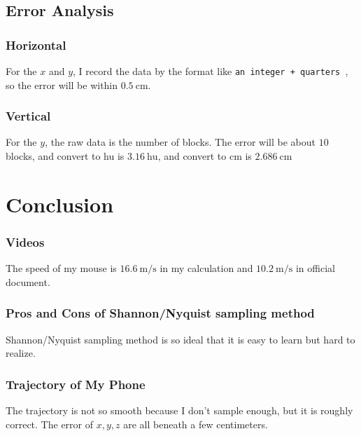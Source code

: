 \documentclass{article}
\begin{document}
\subsection{Error Analysis}
\subsubsection{Horizontal}
For the $x$ and $y$, I record the data by the format like \verb|an integer + quarters |, so the error will be within $0.5 ~ \mathrm{cm}$.
\subsubsection{Vertical}
For the $y$, the raw data is the number of blocks. The error will be about $10$ blocks, and convert to hu is $3.16 ~ \mathrm{hu}$, and convert to cm is $2.686~ \mathrm{cm}$

\section{Conclusion}
\subsubsection*{Videos}
The speed of my mouse is $16.6 ~\mathrm{m/s}$ in my calculation and $10.2 ~\mathrm{m/s}$ in official document.
\subsubsection*{Pros and Cons of Shannon/Nyquist sampling method}
Shannon/Nyquist sampling method is so ideal that it is easy to learn but hard to realize.
\subsubsection*{Trajectory of My Phone}
The trajectory is not so smooth because I don't sample enough, but it is roughly correct. The error of $x, y, z$ are all beneath a few centimeters.


\end{document}
